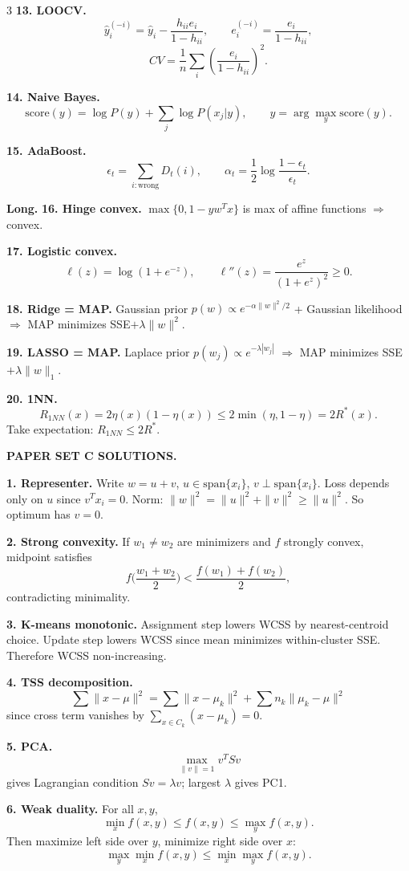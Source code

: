 \documentclass[8pt,fleqn]{extarticle}
\begin{document}
\begin{multicols}{3}
\textbf{13. LOOCV.}
\[
\hat y_i^{(-i)}=\hat y_i-\frac{h_{ii}e_i}{1-h_{ii}},\qquad
e_i^{(-i)}=\frac{e_i}{1-h_{ii}},
\]
\[
CV=\frac1n\sum_i\left(\frac{e_i}{1-h_{ii}}\right)^2.
\]

\textbf{14. Naive Bayes.}
\[
\text{score}(y)=\log P(y)+\sum_j\log P(x_j|y),\qquad \hat y=\arg\max_y \text{score}(y).
\]

\textbf{15. AdaBoost.}
\[
\epsilon_t=\sum_{i:\text{wrong}}D_t(i),\qquad
\alpha_t=\frac12\log\frac{1-\epsilon_t}{\epsilon_t}.
\]

\textbf{Long.}
\textbf{16. Hinge convex.} $\max\{0,1-yw^Tx\}$ is max of affine functions $\Rightarrow$ convex.

\textbf{17. Logistic convex.}
\[
\ell(z)=\log(1+e^{-z}),\qquad
\ell''(z)=\frac{e^z}{(1+e^z)^2}\ge0.
\]

\textbf{18. Ridge = MAP.} Gaussian prior $p(w)\propto e^{-\alpha\|w\|^2/2}$ + Gaussian likelihood $\Rightarrow$ MAP minimizes SSE$+\lambda\|w\|^2$.

\textbf{19. LASSO = MAP.} Laplace prior $p(w_j)\propto e^{-\lambda|w_j|}$ $\Rightarrow$ MAP minimizes SSE$+\lambda\|w\|_1$.

\textbf{20. 1NN.}
\[
R_{1NN}(x)=2\eta(x)(1-\eta(x))\le 2\min(\eta,1-\eta)=2R^*(x).
\]
Take expectation: $R_{1NN}\le2R^*$.

\textbf{PAPER SET C SOLUTIONS.}

\textbf{1. Representer.} Write $w=u+v$, $u\in\mathrm{span}\{x_i\}$, $v\perp \mathrm{span}\{x_i\}$. Loss depends only on $u$ since $v^Tx_i=0$. Norm: $\|w\|^2=\|u\|^2+\|v\|^2\ge\|u\|^2$. So optimum has $v=0$.

\textbf{2. Strong convexity.} If $w_1\neq w_2$ are minimizers and $f$ strongly convex, midpoint satisfies
\[
f\Big(\frac{w_1+w_2}{2}\Big)<\frac{f(w_1)+f(w_2)}{2},
\]
contradicting minimality.

\textbf{3. K-means monotonic.} Assignment step lowers WCSS by nearest-centroid choice. Update step lowers WCSS since mean minimizes within-cluster SSE. Therefore WCSS non-increasing.

\textbf{4. TSS decomposition.}
\[
\sum\|x-\mu\|^2=\sum\|x-\mu_k\|^2+\sum n_k\|\mu_k-\mu\|^2
\]
since cross term vanishes by $\sum_{x\in C_k}(x-\mu_k)=0$.

\textbf{5. PCA.}
\[
\max_{\|v\|=1}v^TSv
\]
gives Lagrangian condition $Sv=\lambda v$; largest $\lambda$ gives PC1.

\textbf{6. Weak duality.} For all $x,y$,
\[
\min_x f(x,y)\le f(x,y)\le \max_y f(x,y).
\]
Then maximize left side over $y$, minimize right side over $x$:
\[
\max_y\min_x f(x,y)\le \min_x\max_y f(x,y).
\]


\end{multicols}
\end{document}
